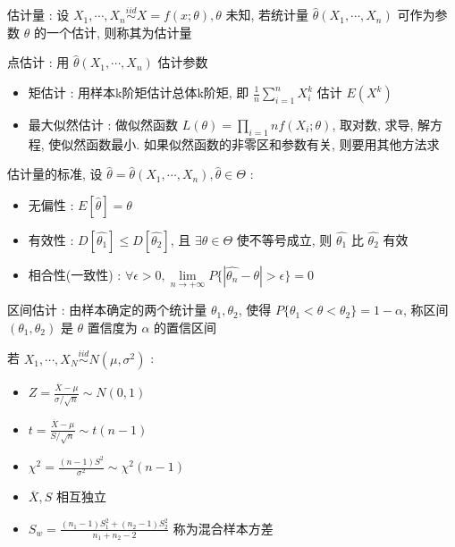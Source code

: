 \documentclass[UTF8, 12pt]{ctexart}
\begin{document}
	估计量 : 设 $ X_{1}, \cdots, X_{n} \overset{iid}{\sim} X = f(x; \theta) , \theta $ 未知, 若统计量 $ \hat{\theta}(X_{1}, \cdots, X_{n}) $ 可作为参数 $  \theta $ 的一个估计, 则称其为估计量

	点估计 : 用 $ \hat{\theta}(X_{1}, \cdots, X_{n}) $ 估计参数
	\begin{itemize}[leftmargin = 4em]
		\item 矩估计 : 用样本k阶矩估计总体k阶矩, 即 $ \frac{1}{n}\sum_{i=1}^{n}X_{i}^{k} $ 估计 $ E(X^{k}) $
		\item 最大似然估计 : 做似然函数 $ L(\theta) = \prod_{i=1}{n}f(X_{i}; \theta) $, 取对数, 求导, 解方程, 使似然函数最小. 如果似然函数的非零区和参数有关, 则要用其他方法求
	\end{itemize}

	估计量的标准, 设 $ \hat{\theta} = \hat{\theta}(X_{1}, \cdots, X_{n}), \hat{\theta} \in \Theta $ :
	\begin{itemize}[leftmargin = 4em]
		\item 无偏性 : $ E[\hat{\theta}] = \theta $
		\item 有效性 : $ D[\hat{\theta_{1}}] \leq D[\hat{\theta_{2}}] $, 且 $ \exists\theta \in \Theta $ 使不等号成立, 则 $ \hat{\theta_{1}} $ 比 $ \hat{\theta_{2}} $ 有效
		\item 相合性(一致性) : $ \forall\epsilon > 0, \lim\limits_{n \to +\infty}P\{|\hat{\theta_{n}} - \theta| > \epsilon\} = 0 $
	\end{itemize}

	区间估计 : 由样本确定的两个统计量 $ \theta_{1}, \theta_{2} $, 使得 $ P\{\theta_{1} < \theta < \theta_{2}\} = 1-\alpha $, 称区间 $ (\theta_{1}, \theta_{2}) $ 是 $ \theta $ 置信度为 $ \alpha $ 的置信区间
	
	若 $ X_{1}, \cdots, X_{N} \overset{iid}{\sim} N(\mu, \sigma^{2}) $ :
	\begin{itemize}[leftmargin = 4em]
		\item $ Z = \frac{\overline{X}-\mu}{\sigma/\sqrt{n}} \sim N(0, 1) $
		\item $ t = \frac{\overline{X}-\mu}{S/\sqrt{n}} \sim t(n-1) $ 
		\item $ \chi^{2} = \frac{(n-1)S^{2}}{\sigma^{2}} \sim \chi^{2}(n-1) $
		\item $ \overline{X}, S $ 相互独立
		\item $ S_{w} = \frac{(n_{1}-1)S_{1}^{2} + (n_{2}-1)S_{2}^{2}}{n_{1}+n_{2}-2} $ 称为混合样本方差
	\end{itemize}
\end{document}
